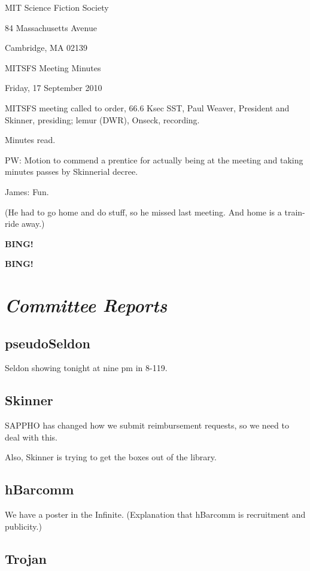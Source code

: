 \documentclass[10pt]{article}
\newcommand{\bing}{{\bf BING!} }
\newcommand{\goto}[1]{\bing \vskip 12pt \section*{{\em{#1}}}}
\newcommand{\skinner}{Paul Weaver, President and Skinner}
\newcommand{\onseck}{lemur (DWR), Onseck}
\newcommand{\meetingdate}{Friday, 17 September 2010}
\begin{document}
\begin{center}

MIT Science Fiction Society

84 Massachusetts Avenue

Cambridge, MA 02139

\vspace{12pt}

MITSFS Meeting Minutes

\meetingdate

\end{center}

\vspace{18pt}

\setlength{\parskip}{6pt}

\noindent
MITSFS meeting called to order, 66.6 Ksec SST,
\skinner, presiding; \onseck, recording.

Minutes read.

PW: Motion to commend a prentice for actually being at the meeting
and taking minutes passes by Skinnerial decree.

James: Fun.

(He had to go home and do stuff, so he missed last meeting.  And
home is a train-ride away.)

\bing

\goto{Committee Reports}

\subsection*{pseudoSeldon}

Seldon showing tonight at nine pm in 8-119.

\subsection*{Skinner}

SAPPHO has changed how we submit reimbursement requests, so we
need to deal with this.

Also, Skinner is trying to get the boxes out of the library.

\subsection*{hBarcomm}

We have a poster in the Infinite.  (Explanation that hBarcomm is
recruitment and publicity.)

\subsection*{Trojan}
\end{document}
